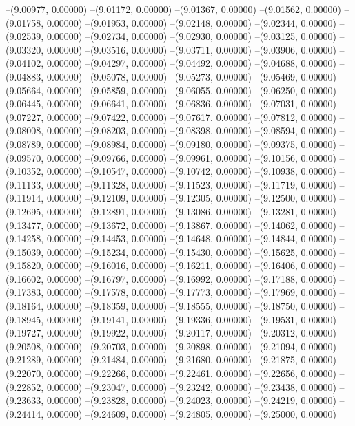 --(9.00977, 0.00000)
--(9.01172, 0.00000)
--(9.01367, 0.00000)
--(9.01562, 0.00000)
--(9.01758, 0.00000)
--(9.01953, 0.00000)
--(9.02148, 0.00000)
--(9.02344, 0.00000)
--(9.02539, 0.00000)
--(9.02734, 0.00000)
--(9.02930, 0.00000)
--(9.03125, 0.00000)
--(9.03320, 0.00000)
--(9.03516, 0.00000)
--(9.03711, 0.00000)
--(9.03906, 0.00000)
--(9.04102, 0.00000)
--(9.04297, 0.00000)
--(9.04492, 0.00000)
--(9.04688, 0.00000)
--(9.04883, 0.00000)
--(9.05078, 0.00000)
--(9.05273, 0.00000)
--(9.05469, 0.00000)
--(9.05664, 0.00000)
--(9.05859, 0.00000)
--(9.06055, 0.00000)
--(9.06250, 0.00000)
--(9.06445, 0.00000)
--(9.06641, 0.00000)
--(9.06836, 0.00000)
--(9.07031, 0.00000)
--(9.07227, 0.00000)
--(9.07422, 0.00000)
--(9.07617, 0.00000)
--(9.07812, 0.00000)
--(9.08008, 0.00000)
--(9.08203, 0.00000)
--(9.08398, 0.00000)
--(9.08594, 0.00000)
--(9.08789, 0.00000)
--(9.08984, 0.00000)
--(9.09180, 0.00000)
--(9.09375, 0.00000)
--(9.09570, 0.00000)
--(9.09766, 0.00000)
--(9.09961, 0.00000)
--(9.10156, 0.00000)
--(9.10352, 0.00000)
--(9.10547, 0.00000)
--(9.10742, 0.00000)
--(9.10938, 0.00000)
--(9.11133, 0.00000)
--(9.11328, 0.00000)
--(9.11523, 0.00000)
--(9.11719, 0.00000)
--(9.11914, 0.00000)
--(9.12109, 0.00000)
--(9.12305, 0.00000)
--(9.12500, 0.00000)
--(9.12695, 0.00000)
--(9.12891, 0.00000)
--(9.13086, 0.00000)
--(9.13281, 0.00000)
--(9.13477, 0.00000)
--(9.13672, 0.00000)
--(9.13867, 0.00000)
--(9.14062, 0.00000)
--(9.14258, 0.00000)
--(9.14453, 0.00000)
--(9.14648, 0.00000)
--(9.14844, 0.00000)
--(9.15039, 0.00000)
--(9.15234, 0.00000)
--(9.15430, 0.00000)
--(9.15625, 0.00000)
--(9.15820, 0.00000)
--(9.16016, 0.00000)
--(9.16211, 0.00000)
--(9.16406, 0.00000)
--(9.16602, 0.00000)
--(9.16797, 0.00000)
--(9.16992, 0.00000)
--(9.17188, 0.00000)
--(9.17383, 0.00000)
--(9.17578, 0.00000)
--(9.17773, 0.00000)
--(9.17969, 0.00000)
--(9.18164, 0.00000)
--(9.18359, 0.00000)
--(9.18555, 0.00000)
--(9.18750, 0.00000)
--(9.18945, 0.00000)
--(9.19141, 0.00000)
--(9.19336, 0.00000)
--(9.19531, 0.00000)
--(9.19727, 0.00000)
--(9.19922, 0.00000)
--(9.20117, 0.00000)
--(9.20312, 0.00000)
--(9.20508, 0.00000)
--(9.20703, 0.00000)
--(9.20898, 0.00000)
--(9.21094, 0.00000)
--(9.21289, 0.00000)
--(9.21484, 0.00000)
--(9.21680, 0.00000)
--(9.21875, 0.00000)
--(9.22070, 0.00000)
--(9.22266, 0.00000)
--(9.22461, 0.00000)
--(9.22656, 0.00000)
--(9.22852, 0.00000)
--(9.23047, 0.00000)
--(9.23242, 0.00000)
--(9.23438, 0.00000)
--(9.23633, 0.00000)
--(9.23828, 0.00000)
--(9.24023, 0.00000)
--(9.24219, 0.00000)
--(9.24414, 0.00000)
--(9.24609, 0.00000)
--(9.24805, 0.00000)
--(9.25000, 0.00000)
